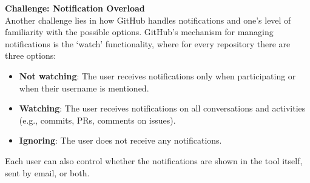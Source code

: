 
\textbf{Challenge: Notification Overload} \\
Another challenge lies in how GitHub handles notifications and one's level of familiarity with the possible options. GitHub's mechanism for managing notifications is the `watch' functionality, where for every repository there are three options:
\begin{itemize}
    \item \textbf{Not watching}: The user receives notifications only when participating or when their username is mentioned.
    \item \textbf{Watching}: The user receives notifications on all conversations and activities (e.g., commits, PRs, comments on issues).
    \item \textbf{Ignoring}: The user does not receive any notifications.
\end{itemize}
Each user can also control whether the notifications are shown in the tool itself, sent by email, or both.


